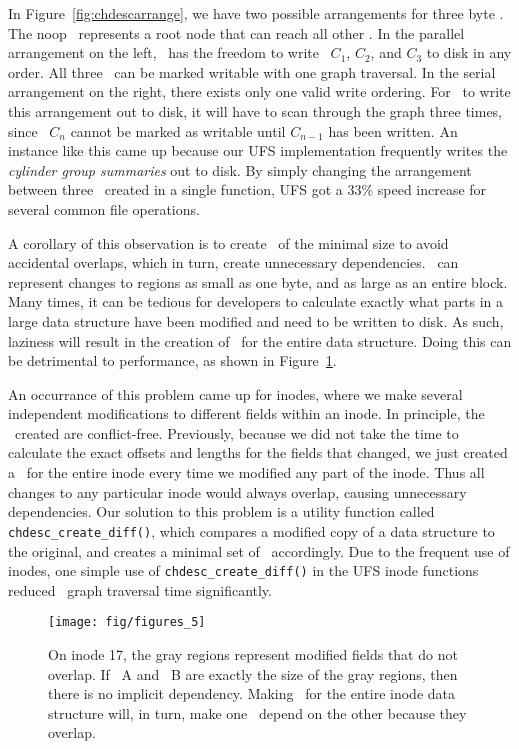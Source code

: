 In Figure~\ref{fig:chdescarrange}, we have two possible arrangements for three
byte \chdescs. The noop \chdesc\ represents a root node that can reach all
other \chdescs. In the parallel arrangement on the left, \Kudos\ has the
freedom to write \chdescs\ $C_1$, $C_2$, and $C_3$ to disk in any order. All
three \chdescs\ can be marked writable with one graph traversal. In the serial
arrangement on the right, there exists only one valid write ordering. For
\Kudos\ to write this arrangement out to disk, it will have to scan through
the graph three times, since \chdesc\ $C_n$ cannot be marked as writable until
$C_{n-1}$ has been written.
An instance like this came up because our UFS implementation frequently writes
the \emph{cylinder group summaries} out to disk. By simply changing the
arrangement between three \chdescs\ created in a single function, UFS got a
33\% speed increase for several common file operations.

A corollary of this observation is to create \chdescs\ of the minimal size to
avoid accidental overlaps, which in turn, create unnecessary dependencies.
\Chdescs\ can represent changes to regions as small as one byte, and as large
as an entire block. Many times, it can be tedious for developers to calculate
exactly what parts in a large data structure have been modified and need to be
written to disk. As such, laziness will result in the creation of \chdescs\
for the entire data structure. Doing this can be detrimental to performance,
as shown in Figure~\ref{fig:overlap}.

An occurrance of this problem came up for inodes, where we make several
independent modifications to different fields within an inode. In principle,
the \chdescs\ created are conflict-free. Previously, because we did not take
the time to calculate the exact offsets and lengths for the fields that
changed, we just created a \chdesc\ for the entire inode every time we modified
any part of the inode. Thus all changes to any particular inode would always
overlap, causing unnecessary dependencies. Our solution to this problem is a
utility function called \texttt{chdesc\_create\_diff()}, which compares a
modified copy of a data structure to the original, and creates a minimal set of
\chdescs\ accordingly. Due to the frequent use of inodes, one simple use of
\texttt{chdesc\_create\_diff()} in the UFS inode functions reduced \chdesc\
graph traversal time significantly.

\begin{figure}[htb]
  \centering
  \texttt{[image: fig/figures\_5]}
  \caption{\label{fig:overlap} On inode 17, the gray regions represent
  modified fields that do not overlap. If \chdesc\ A and \chdesc\ B are
  exactly the size of the gray regions, then there is no implicit dependency.
  Making \chdescs\ for the entire inode data structure will, in turn, make
  one \chdesc\ depend on the other because they overlap.}
\end{figure}


